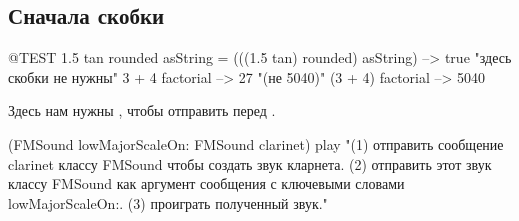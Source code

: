 \documentclass[a4paper,10pt,twoside]{book}
\begin{document}
\subsection{Сначала скобки}

\important{\textbf{Правило Второе.} Сообщения в скобках посылаются раньше других сообщений.\\
\centerline{\ct{(Сообщение в скобках) > Унарное > Бинарное > С ключевыми словами}}}

\begin{code}{@TEST}
1.5 tan rounded asString = (((1.5 tan) rounded) asString) --> true    "здесь скобки не нужны"
3 + 4 factorial   --> 27    "(не 5040)"
(3 + 4) factorial --> 5040
\end{code}

Здесь нам нужны , чтобы отправить  перед .
\begin{code}{}
(FMSound lowMajorScaleOn: FMSound clarinet) play 
"(1) отправить сообщение clarinet классу FMSound чтобы создать звук кларнета.
 (2) отправить этот звук классу FMSound как аргумент сообщения с ключевыми словами lowMajorScaleOn:.
 (3) проиграть полученный звук."
\end{code}



\end{document}
